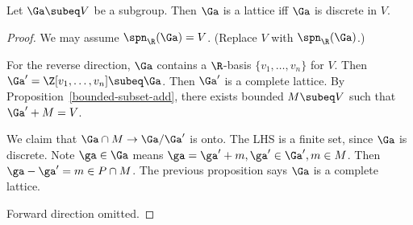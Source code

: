 \begin{pr}
Let $\Ga\subeq V$ be a subgroup. Then $\Ga$ is a lattice iff $\Ga$ is discrete in $V$.
\end{pr}
\begin{proof}
We may assume $\spn_{\R}(\Ga)=V$. (Replace $V$ with $\spn_{\R}(\Ga)$.)

For the reverse direction, $\Ga$ contains a $\R$-basis $\{v_1,\ldots,v_n\}$ for $V$. Then $\Ga'=\Z[v_1,\ldots,v_n]\subeq \Ga$. Then $\Ga'$ is a complete lattice. By Proposition~\ref{bounded-subset-add}, %
there exists bounded $M\subeq V$ such that $\Ga'+M=V$. 

We claim that $\Ga\cap M\to \Ga/\Ga'$ is onto. The LHS is a finite set, since $\Ga$ is discrete. Note $\ga\in \Ga$ means $\ga=\ga'+m, \ga'\in \Ga',m\in M$. Then $\ga-\ga'=m\in P\cap M$. %
The previous proposition says $\Ga$ is a complete lattice.

Forward direction omitted. %
\end{proof}